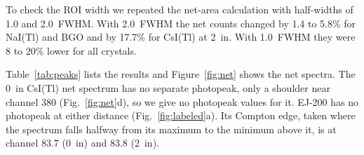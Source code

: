\documentclass[12pt]{article}
\begin{document}
To check the ROI width we repeated the net-area calculation with half-widths of 1.0 and 2.0~FWHM. With 2.0~FWHM the net counts changed by 1.4 to 5.8\% for NaI(Tl) and BGO and by 17.7\% for CsI(Tl) at 2~in. With 1.0~FWHM they were 8 to 20\% lower for all crystals.


Table~\ref{tab:peaks} lists the results and Figure~\ref{fig:net} shows the net spectra. The 0~in CsI(Tl) net spectrum has no separate photopeak, only a shoulder near channel 380 (Fig.~\ref{fig:net}d), so we give no photopeak values for it. EJ-200 has no photopeak at either distance (Fig.~\ref{fig:labeled}a). Its Compton edge, taken where the spectrum falls halfway from its maximum to the minimum above it, is at channel 83.7 (0~in) and 83.8 (2~in).
\end{document}
